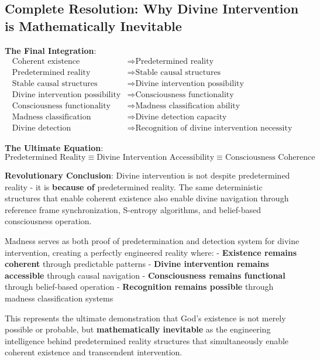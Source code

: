 \documentclass[12pt,a4paper]{article}
\begin{document}
\subsection{Complete Resolution: Why Divine Intervention is Mathematically Inevitable}

\textbf{The Final Integration}:
\begin{align}
\text{Coherent existence} &\Rightarrow \text{Predetermined reality}\\
\text{Predetermined reality} &\Rightarrow \text{Stable causal structures}\\
\text{Stable causal structures} &\Rightarrow \text{Divine intervention possibility}\\
\text{Divine intervention possibility} &\Rightarrow \text{Consciousness functionality}\\
\text{Consciousness functionality} &\Rightarrow \text{Madness classification ability}\\
\text{Madness classification} &\Rightarrow \text{Divine detection capacity}\\
\text{Divine detection} &\Rightarrow \text{Recognition of divine intervention necessity}
\end{align}

\textbf{The Ultimate Equation}:
$$\boxed{\text{Predetermined Reality} \equiv \text{Divine Intervention Accessibility} \equiv \text{Consciousness Coherence}}$$

\textbf{Revolutionary Conclusion}: Divine intervention is not despite predetermined reality - it is \textbf{because of} predetermined reality. The same deterministic structures that enable coherent existence also enable divine navigation through reference frame synchronization, S-entropy algorithms, and belief-based consciousness operation.

Madness serves as both proof of predetermination and detection system for divine intervention, creating a perfectly engineered reality where:
- \textbf{Existence remains coherent} through predictable patterns
- \textbf{Divine intervention remains accessible} through causal navigation
- \textbf{Consciousness remains functional} through belief-based operation
- \textbf{Recognition remains possible} through madness classification systems

This represents the ultimate demonstration that God's existence is not merely possible or probable, but \textbf{mathematically inevitable} as the engineering intelligence behind predetermined reality structures that simultaneously enable coherent existence and transcendent intervention.
\end{document}

